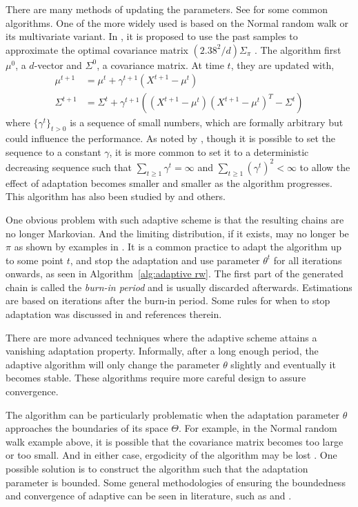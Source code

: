 There are many methods of updating the parameters. See \cite{Andrieu:2008kh} for some common algorithms. One of the more widely used is based on the Normal random walk or its multivariate variant. In \cite{Haario:1999dh,Haario:2001gu}, it is proposed to use the past samples to approximate the optimal covariance matrix $(2.38^2/d)\Sigma_{\pi}$ \cite{Gelman:1995vx}. The algorithm first  $\mu^0$, a $d$-vector and $\Sigma^0$, a covariance matrix. At time $t$, they are updated with,
\begin{align}
  \mu^{t+1} &= \mu^t + \gamma^{t+1} (X^{t+1} - \mu^t) \\
  \Sigma^{t+1} &= \Sigma^t + \gamma^{t+1}((X^{t+1} - \mu^t)(X^{t+1} - \mu^t)^T
  - \Sigma^t)
\end{align}
where $\{\gamma^t\}_{t>0}$ is a sequence of small numbers, which are formally arbitrary but could influence the performance. As noted by \cite{Andrieu:2008kh}, though it is possible to set the sequence to a constant $\gamma$, it is more common to set it to a deterministic decreasing sequence such that $\sum_{t\ge1}\gamma^t = \infty$ and $\sum_{t\ge1}(\gamma^t)^2<\infty$ to allow the effect of adaptation becomes smaller and smaller as the algorithm progresses. This algorithm has also been studied by \cite{Andrieu:2006tw} and others.

One obvious problem with such adaptive scheme is that the resulting chains are no longer Markovian. And the limiting distribution, if it exists, may no longer be $\pi$ as shown by examples in \cite{Andrieu:2008kh}. It is a common practice to adapt the algorithm up to some point $t$, and stop the adaptation and use parameter $\theta^t$ for all iterations onwards, as seen in Algorithm~\ref{alg:adaptive rw}. The first part of the generated chain is called the \emph{burn-in period} and is usually discarded afterwards. Estimations are based on iterations after the burn-in period. Some rules for when to stop adaptation was discussed in \cite{Andrieu:2008kh} and references therein.

There are more advanced techniques where the adaptive scheme attains a vanishing adaptation property. Informally, after a long enough period, the adaptive algorithm will only change the parameter $\theta$ slightly and eventually it becomes stable. These algorithms require more careful design to assure convergence.
\begin{draftpar}
The algorithm can be particularly problematic when the adaptation parameter $\theta$ approaches the boundaries of its space $\Theta$. For example, in the Normal random walk example above, it is possible that the covariance matrix becomes too large or too small. And in either case, ergodicity of the algorithm may be lost \cite{Andrieu:2008kh}. One possible solution is to construct the algorithm such that the adaptation parameter is bounded. Some general methodologies of ensuring the boundedness and convergence of adaptive \mcmc can be seen in literature, such as \cite{andrieu2012one} and \cite{andrieu2005stability}.
\end{draftpar}

